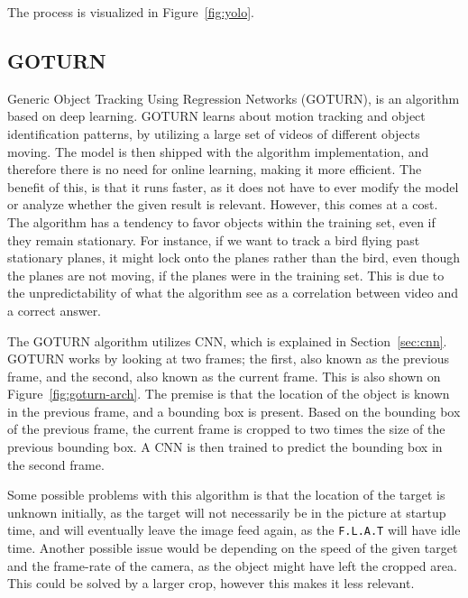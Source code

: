 The process is visualized in Figure~\ref{fig:yolo}.


\subsection{GOTURN}
Generic Object Tracking Using Regression Networks (GOTURN), is an algorithm based on deep learning\cite{goturn}.
GOTURN learns about motion tracking and object identification patterns, by utilizing a large set of videos of different objects moving.
The model is then shipped with the algorithm implementation, and therefore there is no need for online learning, making it more efficient.
The benefit of this, is that it runs faster, as it does not have to ever modify the model or analyze whether the given result is relevant.
However, this comes at a cost. 
The algorithm has a tendency to favor objects within the training set, even if they remain stationary.
For instance, if we want to track a bird flying past stationary planes, it might lock onto the planes rather than the bird, even though the planes are not moving, if the planes were in the training set.
This is due to the unpredictability of what the algorithm see as a correlation between video and a correct answer.


The GOTURN algorithm utilizes CNN, which is explained in Section~\ref{sec:cnn}.
GOTURN works by looking at two frames; the first, also known as the previous frame, and the second, also known as the current frame.
This is also shown on Figure~\ref{fig:goturn-arch}.
The premise is that the location of the object is known in the previous frame, and a bounding box is present.
Based on the bounding box of the previous frame, the current frame is cropped to two times the size of the previous bounding box.
A CNN is then trained to predict the bounding box in the second frame.

Some possible problems with this algorithm is that the location of the target is unknown initially, as the target will not necessarily be in the picture at startup time, and will eventually leave the image feed again, as the \texttt{F.L.A.T} will have idle time.
Another possible issue would be depending on the speed of the given target and the frame-rate of the camera, as the object might have left the cropped area. 
This could be solved by a larger crop, however this makes it less relevant.


